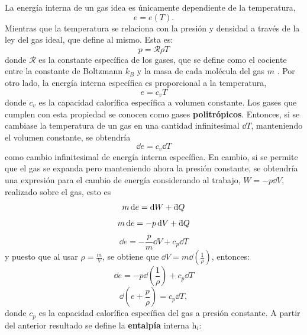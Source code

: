 La energía interna de un gas idea es únicamente dependiente de la temperatura,
\begin{equation}
	e = e(T).
\end{equation}
Mientras que la temperatura se relaciona con la presión y densidad a través de la ley del gas ideal, que define al mismo. Esta es:
\begin{equation}
	p = \mathcal{R}\rho T
	\label{eq:ideal-gas-law}
\end{equation}
donde $\mathcal{R}$ es la constante específica de los gases, que se define como el cociente entre la constante de Boltzmann $k_B$ y  la masa de cada molécula del gas $m$ \cite{blundell}. Por otro lado, la energía interna específica es proporcional a la temperatura,
\begin{equation}
	e = c_{v}T
	\label{eq:energia-interna-1}
\end{equation}
donde $c_{v}$ es la capacidad calorífica específica a volumen constante. Los gases que cumplen con esta propiedad se conocen como gases \textbf{politrópicos}. Entonces, si se cambiase la temperatura de un gas en una cantidad infinitesimal $\dd{T}$, manteniendo el volumen constante, se obtendría
\begin{equation}
	\dd{e} = c_{v} \dd{T}
\end{equation}
como cambio infinitesimal de energía interna específica. En cambio, si se permite que el gas se expanda pero manteniendo ahora la presión constante, se obtendría una expresión para el cambio de energía considerando al trabajo, $W = -p\dd{V}$, realizado sobre el gas, esto es
\begin{equation}
	m\dd{e} = \dd{W} + \dbar Q
\end{equation}
\begin{equation}
	m\dd{e} = -p\dd{V} + \dbar Q
\end{equation}
\begin{equation}
	\dd{e} = -\frac{p}{m}\dd{V} + c_{p}\dd{T}
\end{equation}
y puesto que al usar $\rho = \frac{m}{V}$, se obtiene que $\dd{V} = m\dd(\frac{1}{\rho})$, entonces:
\begin{equation}
	\dd{e} = -p\dd(\frac{1}{\rho}) + c_{p}\dd{T}
\end{equation}
\begin{equation}
	\dd(e + \frac{p}{\rho}) = c_{p}\dd{T},
	\label{eq:entalpia-temp-dif}
\end{equation}
donde $c_p$ es la capacidad calorífica específica del gas a presión constante. A partir del anterior resultado se define la \textbf{entalpía} interna $\mathrm{h}_i$:
